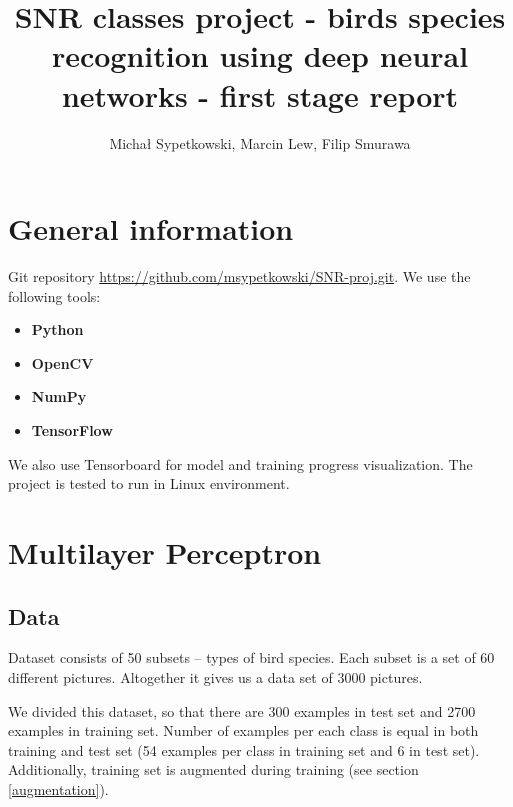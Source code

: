 \documentclass[a4paper]{article}
\begin{document}
\title{SNR classes project - birds species recognition using deep neural networks
- first stage report}

\author{Michał Sypetkowski, Marcin Lew, Filip Smurawa}
\maketitle







\begin{multicols}{2}

\section{General information}
Git repository \url{https://github.com/msypetkowski/SNR-proj.git}.
We use the following tools:
\begin{itemize}
    \item \textbf{Python}\cite{Python}
    \item \textbf{OpenCV}\cite{OpenCV}
    \item \textbf{NumPy}\cite{NumPy}
    \item \textbf{TensorFlow}\cite{TensorFlow}
\end{itemize}
We also use Tensorboard for model and training progress visualization.
The project is tested to run in Linux environment.

\section{Multilayer Perceptron}

\subsection{Data}
Dataset consists of 50 subsets -- types of bird species.
Each subset is a set of 60 different pictures.
Altogether it gives us a data set of 3000 pictures.

We divided this dataset, so that there are 300 examples in test set and
2700 examples in training set.
Number of examples per each class is equal in both training and test set
(54 examples per class in training set and 6 in test set).
Additionally, training set is augmented during training (see section \ref{augmentation}).



\end{multicols}
\end{document}
